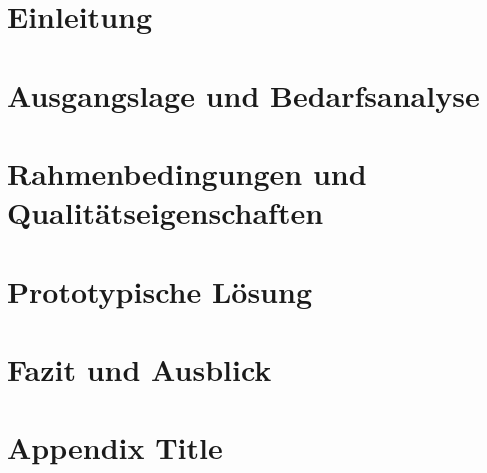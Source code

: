 \documentclass[headings=small,a4paper,12pt,oneside]{scrreprt}
\begin{document}
\singlespacing

\maketitle

\singlespacing
\tableofcontents
\restoregeometry

\singlespacing
\chapter{Einleitung}


\singlespacing 
\chapter{Ausgangslage und Bedarfsanalyse}


\singlespacing
\chapter{Rahmenbedingungen und Qualitätseigenschaften}


\singlespacing 
\chapter{Prototypische Lösung}


\singlespacing 
\chapter{Fazit und Ausblick}


\singlespacing 
\appendix
\chapter{Appendix Title}

\end{document}
